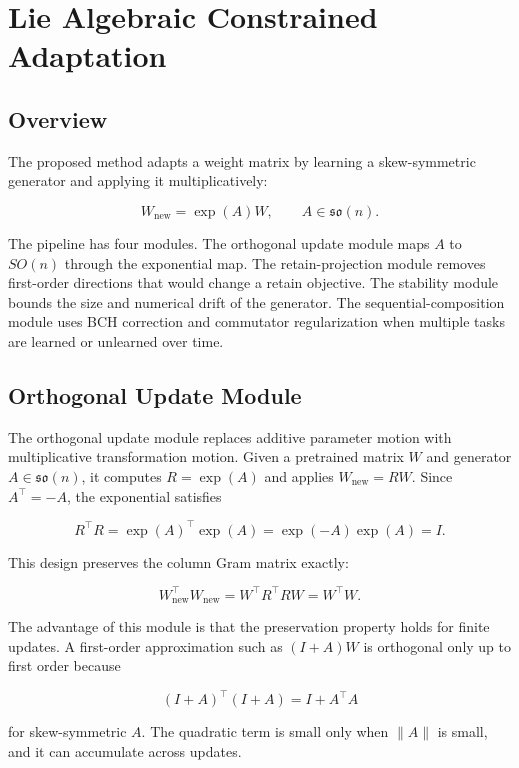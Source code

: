 \documentclass[
]{article}
\begin{document}
\section{Lie Algebraic Constrained Adaptation}\label{lie-algebraic-constrained-adaptation}

\subsection{Overview}\label{overview}

The proposed method adapts a weight matrix by learning a skew-symmetric generator and applying it multiplicatively:

\[
W_{\mathrm{new}}=\exp(A)W,\qquad A\in\mathfrak{so}(n).
\]

The pipeline has four modules. The orthogonal update module maps \(A\) to \(SO(n)\) through the exponential map. The retain-projection module removes first-order directions that would change a retain objective. The stability module bounds the size and numerical drift of the generator. The sequential-composition module uses BCH correction and commutator regularization when multiple tasks are learned or unlearned over time.

\subsection{Orthogonal Update Module}\label{orthogonal-update-module}

The orthogonal update module replaces additive parameter motion with multiplicative transformation motion. Given a pretrained matrix \(W\) and generator \(A\in\mathfrak{so}(n)\), it computes \(R=\exp(A)\) and applies \(W_{\mathrm{new}}=RW\). Since \(A^\top=-A\), the exponential satisfies

\[
R^\top R=\exp(A)^\top\exp(A)=\exp(-A)\exp(A)=I.
\]

This design preserves the column Gram matrix exactly:

\[
W_{\mathrm{new}}^\top W_{\mathrm{new}}
=W^\top R^\top R W
=W^\top W.
\]

The advantage of this module is that the preservation property holds for finite updates. A first-order approximation such as \((I+A)W\) is orthogonal only up to first order because

\[
(I+A)^\top(I+A)=I+A^\top A
\]

for skew-symmetric \(A\). The quadratic term is small only when \(\|A\|\) is small, and it can accumulate across updates.
\end{document}
